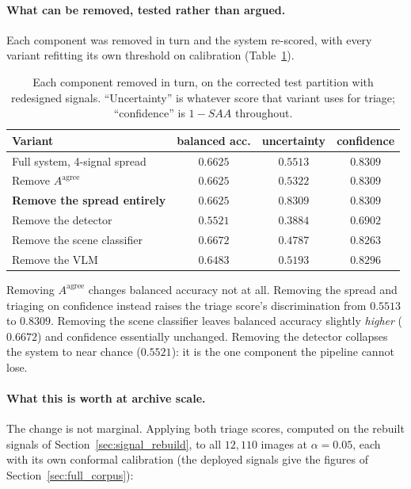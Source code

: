 \documentclass[12pt,a4paper]{report}
\begin{document}
\paragraph{What can be removed, tested rather than argued.} Each component was removed in turn and
the system re-scored, with every variant refitting its own threshold on calibration (Table~\ref{tab:what_can_go}).

\begin{table}[!htbp]
\centering
\caption[What can be removed from the pipeline]{Each component removed in turn, on the corrected test partition with redesigned signals. ``Uncertainty'' is whatever score that variant uses for triage; ``confidence'' is $1-SAA$ throughout.}
\label{tab:what_can_go}
\small
\begin{tabular}{@{}l c c c@{}}
\toprule
\textbf{Variant} & \textbf{balanced acc.} & \textbf{uncertainty} & \textbf{confidence} \\
\midrule
Full system, 4-signal spread & $0.6625$ & $0.5513$ & $0.8309$ \\
Remove $A^{\text{agree}}$ & $0.6625$ & $0.5322$ & $0.8309$ \\
\textbf{Remove the spread entirely} & $0.6625$ & $\mathbf{0.8309}$ & $0.8309$ \\
Remove the detector & $\mathbf{0.5521}$ & $0.3884$ & $0.6902$ \\
Remove the scene classifier & $0.6672$ & $0.4787$ & $0.8263$ \\
Remove the VLM & $0.6483$ & $0.5193$ & $0.8296$ \\
\bottomrule
\end{tabular}
\end{table}

Removing $A^{\text{agree}}$ changes balanced accuracy not at all. Removing the spread and
triaging on confidence instead raises the triage score's discrimination from $0.5513$ to
$0.8309$. Removing the scene classifier leaves balanced accuracy slightly \emph{higher}
($0.6672$) and confidence essentially unchanged. Removing the detector collapses the system to
near chance ($0.5521$): it is the one component the pipeline cannot lose.

\paragraph{What this is worth at archive scale.} The change is not marginal. Applying both triage
scores, computed on the rebuilt signals of Section~\ref{sec:signal_rebuild}, to all $12{,}110$ images at $\alpha=0.05$, each with its own conformal calibration (the deployed signals give the figures of Section~\ref{sec:full_corpus}):
\end{document}
